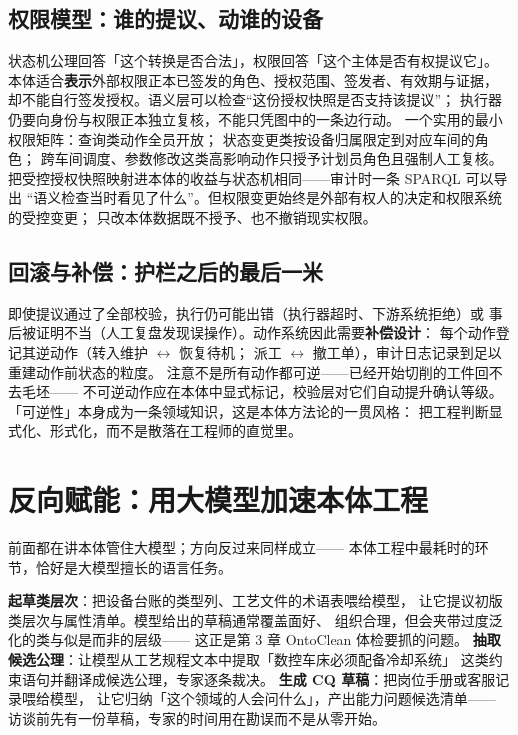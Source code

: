 \subsection{权限模型：谁的提议、动谁的设备}

状态机公理回答「这个转换是否合法」，权限回答「这个主体是否有权提议它」。
本体适合\textbf{表示}外部权限正本已签发的角色、授权范围、签发者、有效期与证据，
却不能自行签发授权。语义层可以检查“这份授权快照是否支持该提议”；
执行器仍要向身份与权限正本独立复核，不能只凭图中的一条边行动。
一个实用的最小权限矩阵：查询类动作全员开放；
状态变更类按设备归属限定到对应车间的角色；
跨车间调度、参数修改这类高影响动作只授予计划员角色且强制人工复核。
把受控授权快照映射进本体的收益与状态机相同——审计时一条 SPARQL 可以导出
“语义检查当时看见了什么”。但权限变更始终是外部有权人的决定和权限系统的受控变更；
只改本体数据既不授予、也不撤销现实权限。

\subsection{回滚与补偿：护栏之后的最后一米}

即使提议通过了全部校验，执行仍可能出错（执行器超时、下游系统拒绝）或
事后被证明不当（人工复盘发现误操作）。动作系统因此需要\textbf{补偿设计}：
每个动作登记其逆动作（转入维护 \(\leftrightarrow\) 恢复待机；
派工 \(\leftrightarrow\) 撤工单），审计日志记录到足以重建动作前状态的粒度。
注意不是所有动作都可逆——已经开始切削的工件回不去毛坯——
不可逆动作应在本体中显式标记，校验层对它们自动提升确认等级。
「可逆性」本身成为一条领域知识，这是本体方法论的一贯风格：
把工程判断显式化、形式化，而不是散落在工程师的直觉里。

\section{反向赋能：用大模型加速本体工程}

前面都在讲本体管住大模型；方向反过来同样成立——
本体工程中最耗时的环节，恰好是大模型擅长的语言任务。

\textbf{起草类层次}：把设备台账的类型列、工艺文件的术语表喂给模型，
让它提议初版类层次与属性清单。模型给出的草稿通常覆盖面好、
组织合理，但会夹带过度泛化的类与似是而非的层级——
这正是第 3 章 OntoClean 体检要抓的问题。
\textbf{抽取候选公理}：让模型从工艺规程文本中提取「数控车床必须配备冷却系统」
这类约束语句并翻译成候选公理，专家逐条裁决。
\textbf{生成 CQ 草稿}：把岗位手册或客服记录喂给模型，
让它归纳「这个领域的人会问什么」，产出能力问题候选清单——
访谈前先有一份草稿，专家的时间用在勘误而不是从零开始。

